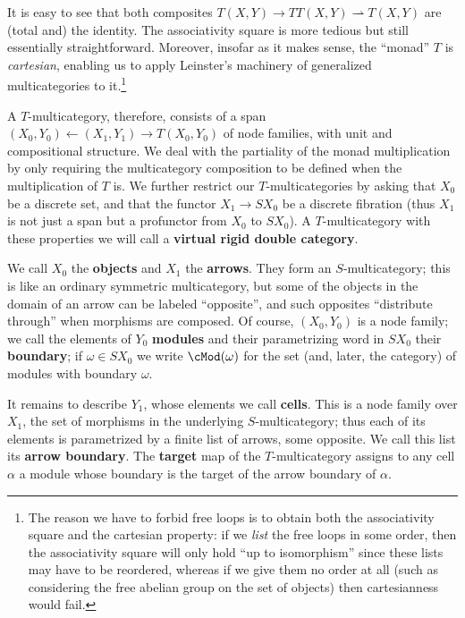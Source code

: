 \documentclass{amsart}
\begin{document}
It is easy to see that both composites $T(X,Y) \to TT(X,Y) \rightharpoonup T(X,Y)$ are (total and) the identity.
The associativity square is more tedious but still essentially straightforward.
Moreover, insofar as it makes sense, the ``monad'' $T$ is \emph{cartesian}, enabling us to apply Leinster's machinery of generalized multicategories to it.\footnote{The reason we have to forbid free loops is to obtain both the associativity square and the cartesian property: if we \emph{list} the free loops in some order, then the associativity square will only hold ``up to isomorphism'' since these lists may have to be reordered, whereas if we give them no order at all (such as considering the free abelian group on the set of objects) then cartesianness would fail.}

A $T$-multicategory, therefore, consists of a span $(X_0,Y_0) \leftarrow (X_1,Y_1) \to T(X_0,Y_0)$ of node families, with unit and compositional structure.
We deal with the partiality of the monad multiplication by only requiring the multicategory composition to be defined when the multiplication of $T$ is.
We further restrict our $T$-multicategories by asking that $X_0$ be a discrete set, and that the functor $X_1 \to S X_0$ be a discrete fibration (thus $X_1$ is not just a span but a profunctor from $X_0$ to $S X_0$).
A $T$-multicategory with these properties we will call a \textbf{virtual rigid double category}.

We call $X_0$ the \textbf{objects} and $X_1$ the \textbf{arrows}.
They form an $S$-multicategory; this is like an ordinary symmetric multicategory, but some of the objects in the domain of an arrow can be labeled ``opposite'', and such opposites ``distribute through'' when morphisms are composed.
Of course, $(X_0,Y_0)$ is a node family; we call the elements of $Y_0$ \textbf{modules} and their parametrizing word in $SX_0$ their \textbf{boundary}; if $\omega\in SX_0$ we write $\cMod(\omega)$ for the set (and, later, the category) of modules with boundary $\omega$.

It remains to describe $Y_1$, whose elements we call \textbf{cells}.
This is a node family over $X_1$, the set of morphisms in the underlying $S$-multicategory; thus each of its elements is parametrized by a finite list of arrows, some opposite.
We call this list its \textbf{arrow boundary}.
The \textbf{target} map of the $T$-multicategory assigns to any cell $\alpha$ a module whose boundary is the target of the arrow boundary of $\alpha$.
\end{document}

